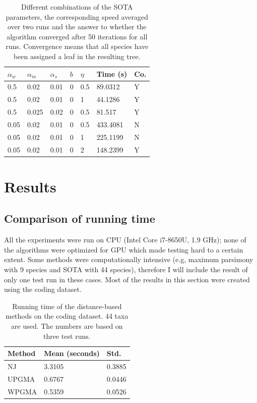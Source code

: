 \documentclass[11pt,twocolumn]{article}
\begin{document}
\begin{table}[H]
	\caption{Different combinations of the SOTA parameters, the corresponding speed averaged over two runs and the answer to whether the algorithm converged after 50 iterations for all runs. Convergence means that all species have been assigned a leaf in the resulting tree.}
	\centering
	\begin{tabular}{lllllll}
		\toprule
		$\alpha_w$ & $\alpha_m$ & $\alpha_s$ & $b$ & $\eta$ & Time (s) & Co. \\
		\midrule
		0.5 & 0.02 & 0.01 & 0 & 0.5 & 89.0312 & Y \\
		0.5 & 0.02 & 0.01 & 0 & 1 & 44.1286 & Y \\
		0.5 & 0.025 & 0.02 & 0 & 0.5 & 81.517 & Y \\
		0.05 & 0.02 & 0.01 & 0 & 0.5 & 433.4081 & N \\
		0.05 & 0.02 & 0.01 & 0 & 1 & 225.1199 & N \\
		0.05 & 0.02 & 0.01 & 0 & 2 & 148.2399 & Y \\
		\bottomrule
	\end{tabular}
	\label{table:sota_parameters}
\end{table}

\section{Results}

\subsection{Comparison of running time}

All the experiments were run on CPU (Intel Core i7-8650U, 1.9 GHz); none of the algorithms were optimized for GPU which made testing hard to a certain extent. Some methods were computationally intensive (e.g, maximum parsimony with 9 species and SOTA with 44 species), therefore I will include the result of only one test run in these cases. Most of the results in this section were created using the coding dataset.

\begin{table}[H]
  \caption{Running time of the distance-based methods on the coding dataset. 44 taxa are used. The numbers are based on three test runs.}
  \centering
  \begin{tabular}{lll}
    \toprule
    Method & Mean (seconds) & Std. \\
    \midrule
    NJ & 3.3105 & 0.3885 \\
    UPGMA & 0.6767 & 0.0446 \\
    WPGMA & 0.5359 & 0.0526 \\	
    \bottomrule
  \end{tabular}
\label{table:distance}
\end{table}
\end{document}
